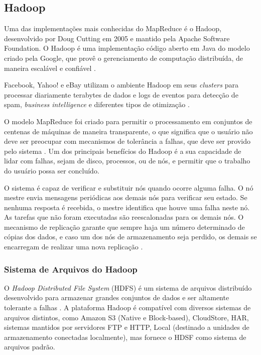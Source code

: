 \subsection{Hadoop}
Uma das implementações mais conhecidas do MapReduce é o Hadoop, desenvolvido por Doug Cutting em 2005 e mantido pela Apache Software Foundation. O Hadoop é uma implementação código aberto em Java do modelo criado pela Google, que provê o gerenciamento de computação distribuída, de maneira escalável e confiável \cite{Hadoop:2010}.

Facebook, Yahoo! e eBay utilizam o ambiente Hadoop em seus \textit{clusters} para processar diariamente terabytes de dados e logs de eventos para detecção de spam, \textit{business intelligence} e diferentes tipos de otimização \cite{Cherkasova:2011}.

O modelo MapReduce foi criado para permitir o processamento em conjuntos de centenas de máquinas de maneira transparente, o que significa que o usuário não deve ser preocupar com mecanismos de tolerância a falhas, que deve ser provido pelo sistema \cite{Dean:2008}. 
Um dos principais benefícios do Hadoop é a sua capacidade de lidar com falhas, sejam de disco, processos, ou de nós, e permitir que o trabalho do usuário possa ser concluído.

O sistema é capaz de verificar e substituir nós quando ocorre alguma falha. O nó mestre envia mensagens periódicas aos demais nós para verificar seu estado. Se nenhuma resposta é recebida, o mestre identifica que houve uma falha neste nó. 
As tarefas que não foram executadas são reescalonadas para os demais nós. O mecanismo de replicação garante que sempre haja um número determinado de cópias dos dados, e caso um dos nós de armazenamento seja perdido, os demais se encarregam de realizar uma nova replicação \cite{Hadoop:2010}.



\subsubsection{Sistema de Arquivos do Hadoop}


O \textit{ Hadoop Distributed File System} (HDFS) é um sistema de arquivos distribuído desenvolvido para armazenar grandes conjuntos de dados e ser altamente tolerante a falhas \cite{Hadoop:2010}.
A plataforma Hadoop é compatível com diversos sistemas de arquivos distintos, como Amazon S3 (Native e Block-based), CloudStore, HAR, sistemas mantidos por servidores FTP e HTTP, Local (destinado a unidades de armazenamento conectadas localmente), mas fornece o HDSF como sistema de arquivos padrão.

